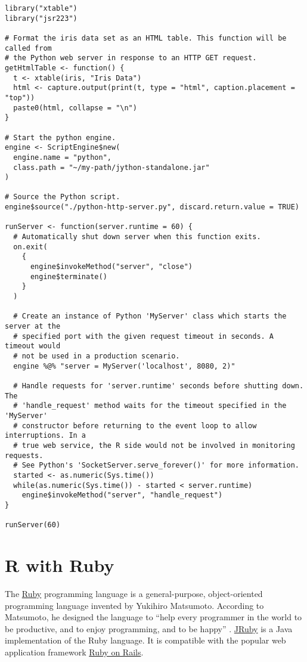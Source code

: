 \documentclass[
article,
11pt, %
a4paper, %
oneside, %
headinclude,footinclude, %
]{scrartcl}
\theoremstyle{definition} %
\theoremstyle{plain} %
\theoremstyle{remark} %
\begin{document}
\begin{verbatim}
library("xtable")
library("jsr223")

# Format the iris data set as an HTML table. This function will be called from
# the Python web server in response to an HTTP GET request.
getHtmlTable <- function() {
  t <- xtable(iris, "Iris Data")
  html <- capture.output(print(t, type = "html", caption.placement = "top"))
  paste0(html, collapse = "\n")
}

# Start the python engine.
engine <- ScriptEngine$new(
  engine.name = "python",
  class.path = "~/my-path/jython-standalone.jar"
)

# Source the Python script.
engine$source("./python-http-server.py", discard.return.value = TRUE)

runServer <- function(server.runtime = 60) {
  # Automatically shut down server when this function exits.
  on.exit(
    {
      engine$invokeMethod("server", "close")
      engine$terminate()
    }
  )

  # Create an instance of Python 'MyServer' class which starts the server at the
  # specified port with the given request timeout in seconds. A timeout would
  # not be used in a production scenario.
  engine %@% "server = MyServer('localhost', 8080, 2)"

  # Handle requests for 'server.runtime' seconds before shutting down. The 
  # 'handle_request' method waits for the timeout specified in the 'MyServer' 
  # constructor before returning to the event loop to allow interruptions. In a 
  # true web service, the R side would not be involved in monitoring requests.
  # See Python's 'SocketServer.serve_forever()' for more information.
  started <- as.numeric(Sys.time())
  while(as.numeric(Sys.time()) - started < server.runtime)
    engine$invokeMethod("server", "handle_request")
}

runServer(60)
\end{verbatim}

\hypertarget{r-with-ruby}{}
\section{R with Ruby}

The \href{https://www.ruby-lang.org}{Ruby} programming language is a general-purpose, object-oriented programming language invented by Yukihiro Matsumoto. According to Matsumoto, he designed the language to ``help every programmer in the world to be productive, and to enjoy programming, and to be happy'' \citep{rubyvideo}. \href{http://jruby.org/}{JRuby} is a Java implementation of the Ruby language. It is compatible with the popular web application framework \href{http://rubyonrails.org/}{Ruby on Rails}.
\end{document}

